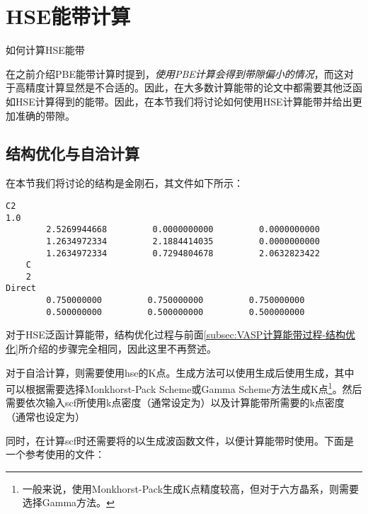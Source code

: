 \section{HSE能带计算}\label{sec:HSE能带计算}

\begin{Abstract}
    \item 如何计算HSE能带
\end{Abstract}


在之前介绍PBE能带计算时提到，\emph{使用PBE计算会得到带隙偏小的情况}，而这对于高精度计算显然是不合适的。因此，在大多数计算能带的论文中都需要其他泛函如HSE计算得到的能带。因此，在本节我们将讨论如何使用HSE计算能带并给出更加准确的带隙。

\subsection{结构优化与自洽计算}\label{subsec:HSE能带计算-结构优化与自洽计算}

在本节我们将讨论的结构是金刚石，其文件如下所示：

\begin{lstlisting}[caption=POSCAR]
C2
1.0
        2.5269944668         0.0000000000         0.0000000000
        1.2634972334         2.1884414035         0.0000000000
        1.2634972334         0.7294804678         2.0632823422
    C
    2
Direct
        0.750000000         0.750000000         0.750000000
        0.500000000         0.500000000         0.500000000
\end{lstlisting}

对于HSE泛函计算能带，结构优化过程与前面\ref{subsec:VASP计算能带过程-结构优化}所介绍的步骤完全相同，因此这里不再赘述。

对于自洽计算，则需要使用hse的K点。生成方法可以使用生成后使用生成，其中可以根据需要选择Monkhorst-Pack Scheme或Gamma Scheme方法生成K点\footnote{一般来说，使用Monkhorst-Pack生成K点精度较高，但对于六方晶系，则需要选择Gamma方法。}。然后需要依次输入scf所使用k点密度（通常设定为）以及计算能带所需要的k点密度（通常也设定为）

同时，在计算scf时还需要将的以生成波函数文件，以便计算能带时使用。下面是一个参考使用的文件：

